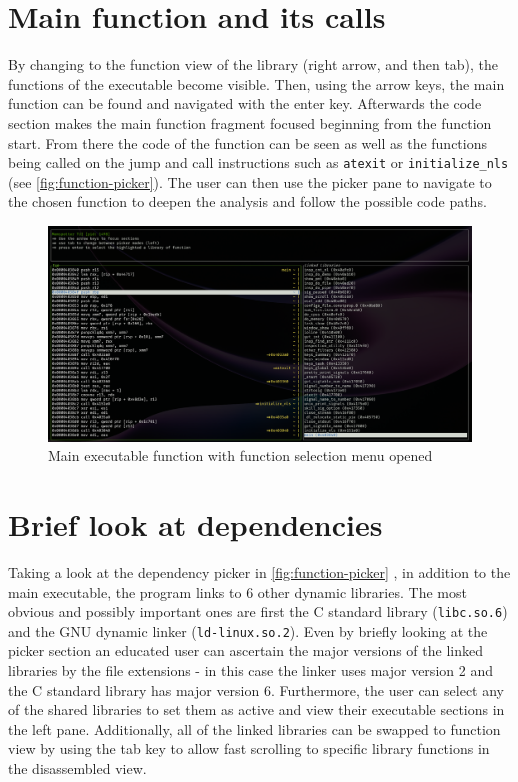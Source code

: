\section{Main function and its calls}

By changing to the function view of the library (right arrow, and then tab), the functions of the executable become visible.
Then, using the arrow keys, the main function can be found and navigated with the enter key.
Afterwards the code section makes the main function fragment focused beginning from the function start.
From there the code of the function can be seen as well as the functions being called on the jump and call instructions such as \verb|atexit| or \verb|initialize_nls| (see \autoref{fig:function-picker}).
The user can then use the picker pane to navigate to the chosen function to deepen the analysis and follow the possible code paths.

\begin{figure}
    \centering
    \includegraphics[width=1\linewidth]{tui-function-select.png}
    \caption{Main executable function with function selection menu opened}
    \label{fig:function-picker}
\end{figure}

\section{Brief look at dependencies}

Taking a look at the dependency picker in \autoref{fig:function-picker} , in addition to the main executable, the program links to 6 other dynamic libraries.
The most obvious and possibly important ones are first the C standard library (\verb|libc.so.6|) and the GNU dynamic linker (\verb|ld-linux.so.2|).
Even by briefly looking at the picker section an educated user can ascertain the major versions of the linked libraries by the file extensions - in this case the linker uses major version 2 and the C standard library has major version 6. 
Furthermore, the user can select any of the shared libraries to set them as active and view their executable sections in the left pane.
Additionally, all of the linked libraries can be swapped to function view by using the tab key to allow fast scrolling to specific library functions in the disassembled view.

